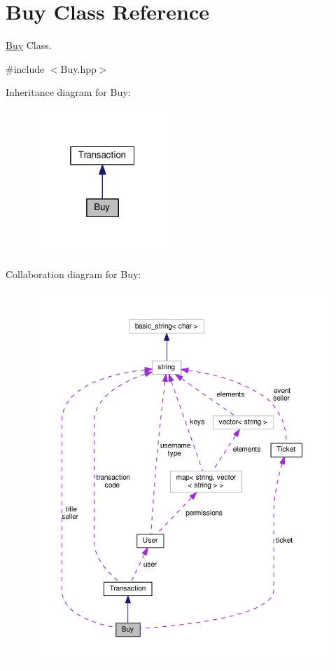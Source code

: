 \hypertarget{class_buy}{\section{Buy Class Reference}
\label{class_buy}
}


\hyperlink{class_buy}{Buy} Class.  




{\ttfamily \#include $<$Buy.\-hpp$>$}



Inheritance diagram for Buy\-:\nopagebreak
\begin{figure}[H]
\begin{center}
\leavevmode
\includegraphics[width=148pt]{class_buy__inherit__graph}
\end{center}
\end{figure}


Collaboration diagram for Buy\-:\nopagebreak
\begin{figure}[H]
\begin{center}
\leavevmode
\includegraphics[width=350pt]{class_buy__coll__graph}
\end{center}
\end{figure}
